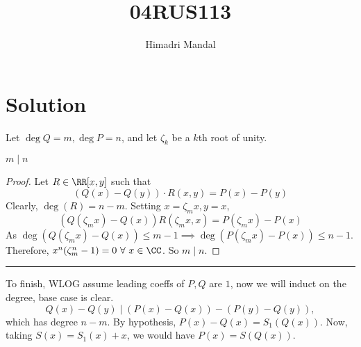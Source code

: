 \documentclass[11pt]{scrartcl}
\title{04RUS113}
\author{Himadri Mandal}
\begin{document}
\maketitle

\section{Solution}
\begin{soln}
Let $\deg Q = m, \deg P = n$, and let $\zeta_k$ be a $k$th root of unity.
\begin{claim*}
$m \mid n$
\end{claim*}
\begin{proof}
  Let $R \in \RR[x,y]$ such that
  \[ (Q(x) - Q(y))\cdot R(x,y) = P(x) - P(y) \]
  Clearly, $\deg(R) = n - m$. Setting $x = \zeta_m x, y = x$,
  \[ (Q(\zeta_m x) - Q(x))R(\zeta_m x,x) = P(\zeta_mx) - P(x)\]
  As $\deg (Q(\zeta_m x) - Q(x)) \leq m-1 \implies \deg(P(\zeta_mx) - P(x)) \leq n-1$.
  Therefore, $x^n(\zeta_m^n - 1) = 0 \ \forall \ x \in \CC$. So $m \mid n$.
   
\end{proof}
\hrule

\bigskip
To finish, WLOG assume leading coeffs of $P,Q$ are $1$, now we will induct on the degree, base case is clear. 
  \[ Q(x) - Q(y) \mid (P(x) - Q(x)) - (P(y) - Q(y)),\] 
  which has degree $n - m$. By hypothesis, $P(x) - Q(x) = S_1(Q(x))$. 
  Now, taking $S(x) = S_1(x) + x$, we would have $P(x) = S(Q(x))$.
\end{soln}
\end{document}
